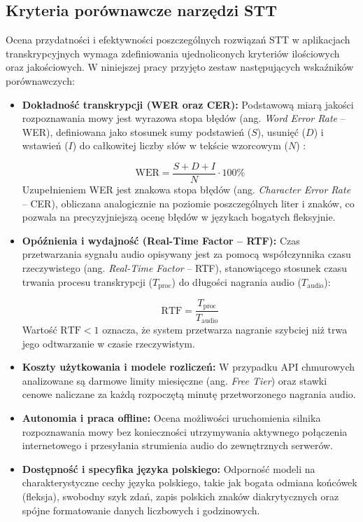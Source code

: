\subsection{Kryteria porównawcze narzędzi STT}
Ocena przydatności i efektywności poszczególnych rozwiązań STT w aplikacjach transkrypcyjnych wymaga zdefiniowania ujednoliconych kryteriów ilościowych oraz jakościowych. W niniejszej pracy przyjęto zestaw następujących wskaźników porównawczych:

\begin{itemize}
\item \textbf{Dokładność transkrypcji (WER oraz CER):} Podstawową miarą jakości rozpoznawania mowy jest wyrazowa stopa błędów (ang. \textit{Word Error Rate} -- WER), definiowana jako stosunek sumy podstawień ($S$), usunięć ($D$) i wstawień ($I$) do całkowitej liczby słów w tekście wzorcowym ($N$) \cite[s.~330]{columbia_asr}:

\begin{equation}
            \text{WER} = \frac{S + D + I}{N} \cdot 100\%
\end{equation}
        Uzupełnieniem WER jest znakowa stopa błędów (ang. \textit{Character Error Rate} -- CER), obliczana analogicznie na poziomie poszczególnych liter i znaków, co pozwala na precyzyjniejszą ocenę błędów w językach bogatych fleksyjnie.

\item \textbf{Opóźnienia i wydajność (Real-Time Factor -- RTF):} Czas przetwarzania sygnału audio opisywany jest za pomocą współczynnika czasu rzeczywistego (ang. \textit{Real-Time Factor} -- RTF), stanowiącego stosunek czasu trwania procesu transkrypcji ($T_{\text{proc}}$) do długości nagrania audio ($T_{\text{audio}}$):

\begin{equation}
            \text{RTF} = \frac{T_{\text{proc}}}{T_{\text{audio}}}
\end{equation}
    Wartość $\text{RTF} < 1$ oznacza, że system przetwarza nagranie szybciej niż trwa jego odtwarzanie w czasie rzeczywistym.

\item \textbf{Koszty użytkowania i modele rozliczeń:} W przypadku API chmurowych analizowane są darmowe limity miesięczne (ang. \textit{Free Tier}) oraz stawki cenowe naliczane za każdą rozpoczętą minutę przetworzonego nagrania audio.

\item \textbf{Autonomia i praca offline:} Ocena możliwości uruchomienia silnika rozpoznawania mowy bez konieczności utrzymywania aktywnego połączenia internetowego i przesyłania strumienia audio do zewnętrznych serwerów.

\item \textbf{Dostępność i specyfika języka polskiego:} Odporność modeli na charakterystyczne cechy języka polskiego, takie jak bogata odmiana końcówek (fleksja), swobodny szyk zdań, zapis polskich znaków diakrytycznych oraz spójne formatowanie danych liczbowych i godzinowych.
\end{itemize}

